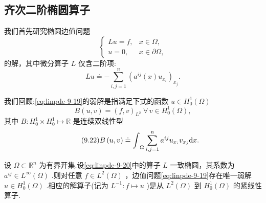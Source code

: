 \subsection{齐次二阶椭圆算子}
我们首先研究椭圆边值问题
\begin{equation}\tag{9.19}\label{eq:linpde-9-19}
\begin{cases} {Lu}  = f, & x \in  \Omega , \\[-3pt]  u = 0, & x \in  \partial \Omega , \end{cases}
\end{equation}
的解，其中微分算子 $L$ 仅含二阶项:
\begin{equation}\tag{9.20}\label{eq:linpde-9-20}
{Lu} \doteq   - \sum_{{i,j = 1}}^{n}{\left( {a}^{ij}\left( x\right) {u}_{{x}_{i}}\right) }_{{x}_{j}}.
\end{equation}

我们回顾:\eqref{eq:linpde-9-19}的弱解是指满足下式的函数 $u \in  {H}_{0}^{1}\left( \Omega \right)$
\begin{equation}\tag{9.21}\label{eq:linpde-9-21}
B\left(  {u,v}\right)   = {\left( f,v\right) }_{{L}^{2}}\;\forall\,v \in  {H}_{0}^{1}\left( \Omega \right) ,
\end{equation}
其中 $B : {H}_{0}^{1} \times  {H}_{0}^{1} \mapsto  \mathbb{R}$ 是连续双线性型
\begin{equation}\tag{9.22}\label{eq:linpde-9-22}
B\left(  {u,v}\right)   \doteq  {\int }_{\Omega }\sum_{{i,j = 1}}^{n}{a}^{ij}{u}_{{x}_{i}}{v}_{{x}_{j}}{\mathop{}\!\mathrm{d} x}.
\end{equation}

\begin{theorem}\label{thm:linpde-9-8}
设 $\Omega  \subset  {\mathbb{R}}^{n}$ 为有界开集.设\eqref{eq:linpde-9-20}中的算子 $L$ 一致椭圆，其系数为 ${a}^{ij} \in  {L}^{\infty }\left( \Omega \right)$ .则对任意 $f \in  {L}^{2}\left( \Omega \right)$ ，边值问题\eqref{eq:linpde-9-19}存在唯一弱解 $u \in  {H}_{0}^{1}\left( \Omega \right)$ .相应的解算子(记为 ${L}^{-1} : f \mapsto  u$ )是从 ${L}^{2}\left( \Omega \right)$ 到 ${H}_{0}^{1}\left( \Omega \right)$ 的紧线性算子.
\end{theorem}

